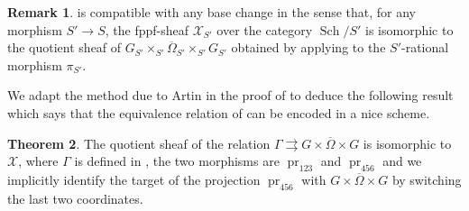 \documentclass[11pt, reqno]{amsart}
\theoremstyle{plain}
\theoremstyle{definition}
\newtheorem{theorem}{Theorem}[section]
\newtheorem{remark}[theorem]{Remark}
\DeclareMathOperator{\pr}{pr}	%
\DeclareMathOperator{\Sch}{Sch}
\begin{document}
\begin{remark}
     is compatible with any base change in the sense that, for any morphism $S'\longrightarrow S$, the fppf-sheaf $\mathcal{X}_{S'}$ over the category $\Sch/S'$ is isomorphic to the quotient sheaf of $ G_{S'}\times_{S'}\overline{\Omega}_{S'}\times_{S'} G_{S'}$ obtained by applying  to the $S'$-rational morphism $\pi_{S'}$.
\end{remark}


We adapt the method due to Artin in the proof of \cite[exposé~XVIII, proposition~3.5]{SGA3II} to deduce the following result which says that the equivalence relation of   can be encoded in a nice scheme.

\begin{theorem}\label{algebraicspace}
    The quotient sheaf of the relation $\Gamma\rightrightarrows G\times\overline{\Omega}\times G$ is isomorphic to $\mathcal{X}$, where $\Gamma$ is defined in , the two morphisms are $\pr_{123}$ and $\pr_{456}$ and we implicitly identify the target of the projection $\pr_{456}$ with $ G\times\overline{\Omega}\times G$ by switching the last two coordinates.
\end{theorem}
\end{document}
